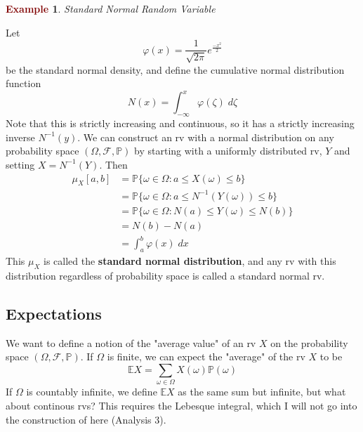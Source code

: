 \documentclass[11pt]{article}
\theoremstyle{definition}
\theoremstyle{definition}
\theoremstyle{definition}
\newtheorem{ex}{\textcolor{Maroon}{Example}}
\theoremstyle{remark}
\begin{document}
\begin{ex}\textit{Standard Normal Random Variable}

    Let 
    \[
        \varphi(x) = \frac{1}{\sqrt{2 \pi}} e^{\frac{-x^2}{2}}
    \] 
    be the standard normal density, and define the cumulative normal distribution function
    \[
        N(x) = \int_{-\infty}^x \varphi(\zeta) \; d\zeta
    \] 
    Note that this is strictly increasing and continuous, so it has a strictly increasing inverse $N^{-1}(y)$.
    We can construct an rv with a normal distribution on any probability space $(\Omega, \mathcal{F}, \mathbb{P})$
    by starting with a uniformly distributed rv, $Y$ and setting $X = N^{-1}(Y)$. Then
    \begin{align*}
        \mu_X[a, b] &= \mathbb{P}\{\omega \in \Omega : a \leq X(\omega) \leq b\} \\
        &= \mathbb{P}\{\omega \in \Omega : a \leq N^{-1}(Y(\omega)) \leq b\} \\
        &= \mathbb{P}\{\omega \in \Omega : N(a) \leq Y(\omega) \leq N(b)\} \\
        &= N(b) - N(a) \\
        &= \int_a^b \varphi(x) \; dx
    \end{align*}  
    This $\mu_X$ is called the \textbf{standard normal distribution}, and any rv with this distribution regardless
    of probability space is called a standard normal rv. 
\end{ex}

\subsection{Expectations}

We want to define a notion of the "average value" of an rv $X$ on the probability space $(\Omega, \mathcal{F}, \mathbb{P})$.
If $\Omega$ is finite, we can expect the "average" of the rv $X$ to be 
\[
    \mathbb{E}X = \sum_{\omega \in \Omega} X(\omega) \mathbb{P}(\omega)
\]  
If $\Omega$ is countably infinite, we define $\mathbb{E}X$ as the same sum but infinite, but what about continous rvs?
This requires the Lebesque integral, which I will not go into the construction of here (Analysis 3). 
\end{document}
